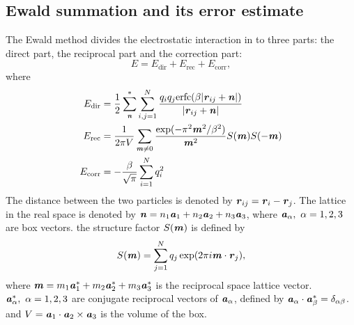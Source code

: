 \documentclass[aps,pre,preprint,unsortedaddress]{revtex4}
\newcommand{\redc}[1]{{\color{red} #1}}
\renewcommand{\v}[1]{\textbf{\textit{#1}}}
\begin{document}
\subsection{Ewald summation and its error estimate}
The Ewald method divides the electrostatic interaction in to three
parts: the direct part, the reciprocal part and the correction
part:
\begin{equation}
E = E_{\textrm{dir}} + E_{\textrm{rec}} + E_{\textrm{corr}},
\end{equation}
where 
\begin {align}\label{eqn:tmp2}
E_{\textrm{dir}} & = \frac12 \sum^{\ast}_{\v n}
\sum_{i,j = 1}^{N} \frac{q_iq_j \textrm{erfc}(\beta \vert\v{r}_{ij} + \v{n}\vert)}
{\vert\v{r}_{ij} + \v{n}\vert} \\\label{eqn:tmp3}
E_{\textrm{rec}} & = \frac1{2\pi V} \sum_{\v m \neq 0}
\frac{\exp(-\pi^2\v m^2 / \beta^2)}{\v m^2} S(\v m) S(-\v m) \\\label{eqn:tmp4}
 E_{\textrm{corr}}& = -\frac\beta{\sqrt \pi} \sum_{i=1}^N q_i^2
\end {align}
The distance between the two particles is denoted by $\v r_{ij} = \v
r_i - \v r_j$.  The lattice in the real space is denoted
by $\v n = n_1 \v a_1 + n_2 \v a_2 + n_3 \v a_3$, where $\v a_\alpha,
\ \alpha=1,2,3$ are box vectors. the structure factor $S(\v m)$ is
defined by
\begin{equation}\label{sm1}
S(\v m) = \sum_{j=1}^N q_j \exp (2 \pi i \v m \cdot \v r_j),
\end{equation}
where $\v m = m_1 \v a_1^\ast + m_2 \v a_2^\ast + m_3 \v a_3^\ast$ is
the reciprocal space lattice \redc{vector}. $\v a_\alpha^\ast,\ \alpha = 1,
2, 3$ are conjugate reciprocal vectors of $\v a_\alpha$, defined by
$\v a_\alpha \cdot \v a_\beta^\ast = \delta_{\alpha\beta}$. and $V =
\v a_1 \cdot \v a_2 \times \v a_3$ is the volume of the box.
\end{document}
